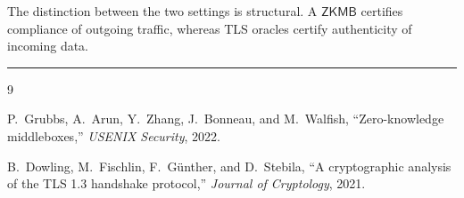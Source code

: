 \documentclass[11pt]{article}
\newcommand{\ZKMB}{\ensuremath{\mathsf{ZKMB}}}
\begin{document}
\begin{remark}
The distinction between the two settings is structural.  A \ZKMB{} certifies
compliance of outgoing traffic, whereas TLS oracles certify authenticity of
incoming data.
\end{remark}

\bigskip
\hrule
\bigskip

\begin{thebibliography}{9}

  P.~Grubbs, A.~Arun, Y.~Zhang, J.~Bonneau, and M.~Walfish,
  ``Zero-knowledge middleboxes,''
  \emph{USENIX Security}, 2022.

  B.~Dowling, M.~Fischlin, F.~G\"unther, and D.~Stebila,
  ``A cryptographic analysis of the TLS 1.3 handshake protocol,''
  \emph{Journal of Cryptology}, 2021.

\end{thebibliography}
\end{document}
